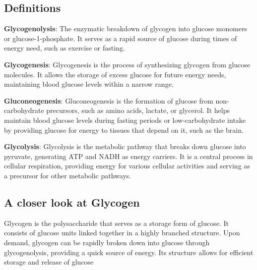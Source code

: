 \documentclass[]{tufte-handout}
\begin{document}
\subsection{Definitions}\label{definitions}

\textbf{Glycogenolysis}: The enzymatic breakdown of glycogen into glucose monomers or glucose-1-phosphate. It serves as a rapid source of glucose during times of energy need, such as exercise or fasting.

\textbf{Glycogenesis}: Glycogenesis is the process of synthesizing glycogen from glucose molecules. It allows the storage of excess glucose for future energy needs, maintaining blood glucose levels within a narrow range.

\textbf{Gluconeogenesis}: Gluconeogenesis is the formation of glucose from non-carbohydrate precursors, such as amino acids, lactate, or glycerol. It helps maintain blood glucose levels during fasting periods or low-carbohydrate intake by providing glucose for energy to tissues that depend on it, such as the brain.

\textbf{Glycolysis}: Glycolysis is the metabolic pathway that breaks down glucose into pyruvate, generating ATP and NADH as energy carriers. It is a central process in cellular respiration, providing energy for various cellular activities and serving as a precursor for other metabolic pathways.

\subsection{A closer look at Glycogen}\label{a-closer-look-at-glycogen}

Glycogen is the polysaccharide that serves as a storage form of glucose. It consists of glucose units linked together in a highly branched structure. Upon demand, glycogen can be rapidly broken down into glucose through glycogenolysis, providing a quick source of energy. Its structure allows for efficient storage and release of glucose
\end{document}
